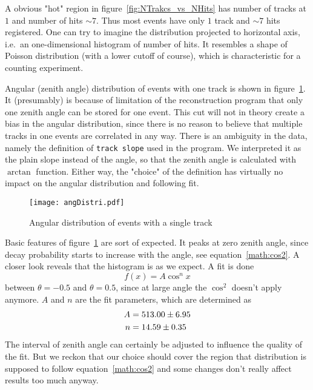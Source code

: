 A obvious "hot" region in figure~\ref{fig:NTrakcs_vs_NHits} has number of tracks at $1$ and number of hits $\sim 7$. Thus most events have only $1$ track and $\sim 7$ hits registered. One can try to imagine the distribution projected to horizontal axis, i.e.~an one-dimensional histogram of number of hits. It resembles a shape of Poisson distribution (with a lower cutoff of course), which is characteristic for a counting experiment.

Angular (zenith angle) distribution of events with one track is shown in figure~\ref{fig:angDistri}. It (presumably) is because of limitation of the reconstruction program that only one zenith angle can be stored for one event. This cut will not in theory create a bias in the angular distribution, since there is no reason to believe that multiple tracks in one events are correlated in any way. There is an ambiguity in the data, namely the definition of \verb|track slope| used in the program. We interpreted it as the plain slope instead of the angle, so that the zenith angle is calculated with $\arctan$ function. Either way, the "choice" of the definition has virtually no impact on the angular distribution and following fit.

\begin{figure}[ht]
	\centering
	\texttt{[image: angDistri.pdf]}
	\caption{Angular distribution of events with a single track}%
	\label{fig:angDistri}
\end{figure}
Basic features of figure~\ref{fig:angDistri} are sort of expected. It peaks at zero zenith angle, since decay probability starts to increase with the angle, see equation~\ref{math:cos2}. A closer look reveals that the histogram is as we expect. A fit is done
\begin{equation*}
	f(x) = A  \cos^n x
\end{equation*}
between $\theta=-0.5$ and $\theta=0.5$, since at large angle the $\cos^2$ doesn't apply anymore. $A$ and $n$ are the fit parameters, which are determined as
\begin{align*}
	A &= \num{513.00 +- 6.95} \\
	n &= \num{14.59 +- 0.35} 
\end{align*}
The interval of zenith angle can certainly be adjusted to influence the quality of the fit. But we reckon that our choice should cover the region that distribution is supposed to follow equation~\ref{math:cos2} and some changes don't really affect results too much anyway.

